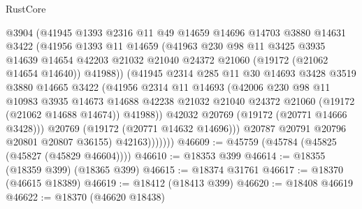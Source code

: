 \begin{lexlean}{RustCore}
\begin{coremodule}
                    @3904
                    (@41945
                      @1393
                      @2316
                      @11
                      @49
                      @14659
                      @14696
                      @14703
                      @3880
                      @14631
                      @3422
                      (@41956
                        @1393
                        @11
                        @14659
                        (@41963
                          @230
                          @98
                          @11
                          @3425
                          @3935
                          @14639
                          @14654
                          @42203
                          @21032
                          @21040
                          @24372
                          @21060
                          (@19172 (@21062 @14654 @14640))
                          @41988))
                      (@41945
                        @2314
                        @285
                        @11
                        @30
                        @14693
                        @3428
                        @3519
                        @3880
                        @14665
                        @3422
                        (@41956
                          @2314
                          @11
                          @14693
                          (@42006
                            @230
                            @98
                            @11
                            @10983
                            @3935
                            @14673
                            @14688
                            @42238
                            @21032
                            @21040
                            @24372
                            @21060
                            (@19172 (@21062 @14688 @14674))
                            @41988))
                        @42032
                        @20769
                        (@19172 (@20771 @14666 @3428)))
                      @20769
                      (@19172 (@20771 @14632 @14696)))
                    @20787
                    @20791
                    @20796
                    @20801
                    @20807
                    @36155)
                  @42163)))))))
@46609 := @45759 (@45784 (@45825 (@45827 (@45829 @46604))))
@46610 := @18353 @399
@46614 := @18355 (@18359 @399) (@18365 @399)
@46615 := @18374 @31761
@46617 := @18370 (@46615 @18389)
@46619 := @18412 (@18413 @399)
@46620 := @18408 @46619
@46622 := @18370 (@46620 @18438)

\end{coremodule}
\end{lexlean}
